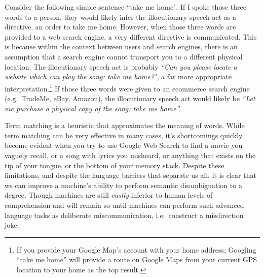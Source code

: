 Consider the following simple sentence ``take me home". If I spoke those three words to a person, they would likely infer the illocutionary speech act as a directive, an order to take me home. However, when those three words are provided to a web search engine, a very different directive is communicated. This is because within the context between users and search engines, there is an assumption that a search engine cannot transport you to a different physical location. The illocutionary speech act is probably \textit{``Can you please locate a website which can play the song: take me home?"}, a far more appropriate interpretation.\footnote{If you provide your Google Map's account with your home address; Googling ``take me home'' will provide a route on Google Maps from your current GPS location to your home as the top result.} If those three words were given to an ecommerce search engine (e.g.\ TradeMe, eBay, Amazon), the illocutionary speech act would likely be \textit{``Let me purchase a physical copy of the song: take me home''.}

Term matching is a heuristic that approximates the meaning of words. While term matching can be very effective in many cases, it's shortcomings quickly become evident when you try to use Google Web Search to find a movie you vaguely recall, or a song with lyrics you misheard, or anything that exists on the tip of your tongue, or the bottom of your memory stack. Despite these limitations, and despite the language barriers that separate us all, it is clear that we can improve a machine's ability to perform semantic disambiguation to a degree. Though machines are still \textit{vastly} inferior to human levels of comprehension and will remain so until machines can perform such advanced language tasks as deliberate miscommunication, i.e.\ construct a misdirection joke.









